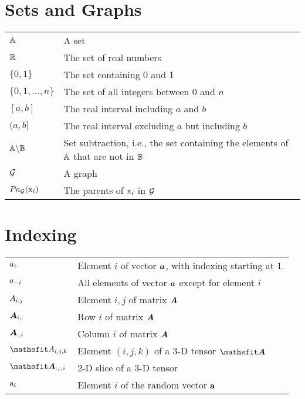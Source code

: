 \section*{Sets and Graphs}
\def\arraystretch{1.5}
\begin{longtable}{p{}p{}}
$\displaystyle {\mathbb{A}}$ & A set\\
$\displaystyle \mathbb{R}$ & The set of real numbers \\
$\displaystyle \{0, 1\}$ & The set containing 0 and 1 \\
$\displaystyle \{0, 1, \dots, n \}$ & The set of all integers between $0$ and $n$\\
$\displaystyle [a, b]$ & The real interval including $a$ and $b$\\
$\displaystyle (a, b]$ & The real interval excluding $a$ but including $b$\\
$\displaystyle {\mathbb{A}} \backslash {\mathbb{B}}$ & Set subtraction, i.e., the set containing the elements of ${\mathbb{A}}$ that are not in ${\mathbb{B}}$\\
$\displaystyle {\mathcal{G}}$ & A graph\\
$\displaystyle Pa_{\mathcal{G}}({\textnormal{x}}_i)$ & The parents of ${\textnormal{x}}_i$ in ${\mathcal{G}}$
\end{longtable}
%
%
\section*{Indexing}
\def\arraystretch{1.5}
\begin{longtable}{p{}p{}}
$\displaystyle {a}_i$ & Element $i$ of vector ${\bm{a}}$, with indexing starting at 1.\\
$\displaystyle {a}_{-i}$ & All elements of vector ${\bm{a}}$ except for element $i$ \\
$\displaystyle {A}_{i,j}$ & Element $i, j$ of matrix ${\bm{A}}$ \\
$\displaystyle {\bm{A}}_{i, :}$ & Row $i$ of matrix ${\bm{A}}$ \\
$\displaystyle {\bm{A}}_{:, i}$ & Column $i$ of matrix ${\bm{A}}$ \\
$\displaystyle \etA_{i, j, k}$ & Element $(i, j, k)$ of a 3-D tensor $\tA$\\
$\displaystyle \tA_{:, :, i}$ & 2-D slice of a 3-D tensor\\
$\displaystyle {\textnormal{a}}_i$ & Element $i$ of the random vector ${\mathbf{a}}$ \\
\end{longtable}
%
%

